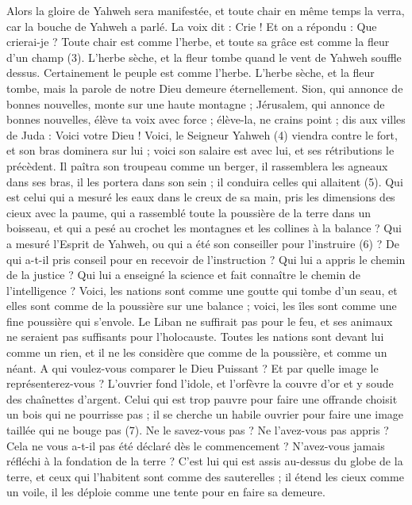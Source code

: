 \begin{multicols}{2}
{Alors la gloire de Yahweh sera manifestée, et toute chair en même temps la verra, car la bouche de Yahweh a parlé.
La voix dit : Crie ! Et on a répondu : Que crierai-je ? Toute chair est comme l'herbe, et toute sa grâce est comme la fleur d'un champ (3).
L'herbe sèche, et la fleur tombe quand le vent de Yahweh souffle dessus. Certainement le peuple est comme l'herbe.
L'herbe sèche, et la fleur tombe, mais la parole de notre Dieu demeure éternellement.
Sion, qui annonce de bonnes nouvelles, monte sur une haute montagne ; Jérusalem, qui annonce de bonnes nouvelles, élève ta voix avec force ; élève-la, ne crains point ; dis aux villes de Juda : Voici votre Dieu !
Voici, le Seigneur Yahweh (4) viendra contre le fort, et son bras dominera sur lui ; voici son salaire est avec lui, et ses rétributions le précèdent.
Il paîtra son troupeau comme un berger, il rassemblera les agneaux dans ses bras, il les portera dans son sein ; il conduira celles qui allaitent (5).
Qui est celui qui a mesuré les eaux dans le creux de sa main, pris les dimensions des cieux avec la paume, qui a rassemblé toute la poussière de la terre dans un boisseau, et qui a pesé au crochet les montagnes et les collines à la balance ?
Qui a mesuré l'Esprit de Yahweh, ou qui a été son conseiller pour l’instruire (6) ?
De qui a-t-il pris conseil pour en recevoir de l’instruction ? Qui lui a appris le chemin de la justice ? Qui lui a enseigné la science et fait connaître le chemin de l’intelligence ?
Voici, les nations sont comme une goutte qui tombe d'un seau, et elles sont comme de la poussière sur une balance ; voici, les îles sont comme une fine poussière qui s’envole.
Le Liban ne suffirait pas pour le feu, et ses animaux ne seraient pas suffisants pour l'holocauste.
Toutes les nations sont devant lui comme un rien, et il ne les considère que comme de la poussière, et comme un néant.
A qui voulez-vous comparer le Dieu Puissant ? Et par quelle image le représenterez-vous ?
L'ouvrier fond l’idole, et l'orfèvre la couvre d’or et y soude des chaînettes d'argent.
Celui qui est trop pauvre pour faire une offrande choisit un bois qui ne pourrisse pas ; il se cherche un habile ouvrier pour faire une image taillée qui ne bouge pas (7).
Ne le savez-vous pas ? Ne l’avez-vous pas appris ? Cela ne vous a-t-il pas été déclaré dès le commencement ? N’avez-vous jamais réfléchi à la fondation de la terre ?
C'est lui qui est assis au-dessus du globe de la terre, et ceux qui l’habitent sont comme des sauterelles ; il étend les cieux comme un voile, il les déploie comme une tente pour en faire sa demeure.
}
\end{multicols}
